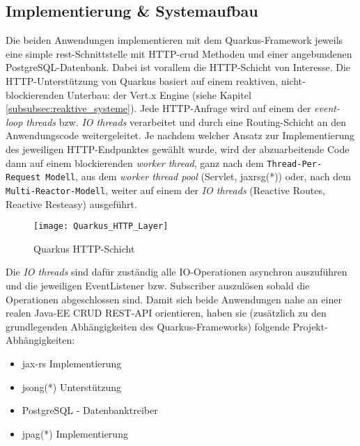 \subsection{Implementierung \& Systemaufbau}
\label{section:implementierung}
Die beiden Anwendungen implementieren mit dem Quarkus-Framework jeweils eine simple \acrshort{rest}-Schnittstelle mit HTTP-\acrshort{crud} Methoden
und einer angebundenen PostgreSQL-Datenbank.
Dabei ist vorallem die HTTP-Schicht von Interesse. Die HTTP-Unterstützung von Quarkus basiert auf einem reaktiven, nicht-blockierenden
Unterbau: der Vert.x Engine (siehe Kapitel \ref{subsubsec:reaktive_systeme}).
Jede HTTP-Anfrage wird auf einem der \textit{event-loop threads} bzw. \textit{IO threads}
verarbeitet und durch eine Routing-Schicht an den Anwendungscode weitergeleitet.
Je nachdem welcher Ansatz zur Implementierung des jeweiligen HTTP-Endpunktes gewählt wurde,
wird der abzuarbeitende Code dann auf einem blockierenden \textit{worker thread}, ganz nach dem \verb|Thread-Per-Request Modell|, aus dem
\textit{worker thread pool} (Servlet, \Gls{jaxrsg}(*)) oder, nach dem \verb|Multi-Reactor-Modell|, weiter auf einem der
\textit{IO threads} (Reactive Routes, Reactive Resteasy) ausgeführt.

\newpage
\begin{figure}[h]
    \centering
    \texttt{[image: Quarkus\_HTTP\_Layer]}
    \caption{Quarkus HTTP-Schicht \parencite{QuarkusReactiveRoutes}}
    \label{fig:quarkus_http_schicht}
\end{figure}

Die \textit{IO threads} sind dafür zuständig alle IO-Operationen asynchron auszuführen und die jeweiligen EventListener bzw. Subscriber
auszulösen sobald die Operationen abgeschlossen sind.
Damit sich beide Anwendungen nahe an einer realen Java-EE CRUD REST-API orientieren, haben
sie (zusätzlich zu den grundlegenden Abhängigkeiten des Quarkus-Frameworks) folgende Projekt-Abhängigkeiten:
\begin{itemize}
    \item \acrshort{jax-rs} Implementierung
    \item \Gls{jsong}(*) Unterstützung
    \item PostgreSQL - Datenbanktreiber
    \item \Gls{jpag}(*) Implementierung
\end{itemize}

